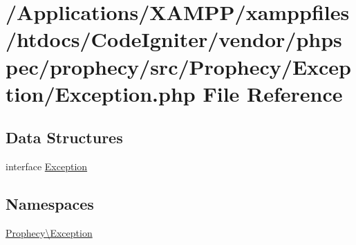 \hypertarget{phpspec_2prophecy_2src_2_prophecy_2_exception_2_exception_8php}{}\section{/\+Applications/\+X\+A\+M\+P\+P/xamppfiles/htdocs/\+Code\+Igniter/vendor/phpspec/prophecy/src/\+Prophecy/\+Exception/\+Exception.php File Reference}
\label{phpspec_2prophecy_2src_2_prophecy_2_exception_2_exception_8php}
\subsection*{Data Structures}
\begin{DoxyCompactItemize}
\item 
interface \mbox{\hyperlink{interface_prophecy_1_1_exception_1_1_exception}{Exception}}
\end{DoxyCompactItemize}
\subsection*{Namespaces}
\begin{DoxyCompactItemize}
\item 
 \mbox{\hyperlink{namespace_prophecy_1_1_exception}{Prophecy\textbackslash{}\+Exception}}
\end{DoxyCompactItemize}
